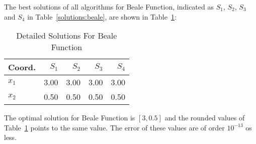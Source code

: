 
The best solutions of all algorithms for Beale Function, indicated as
$S_{1}$, $S_{2}$, $S_{3}$ and $S_{4}$ in Table~\ref{solutions:beale}, are shown
in Table~\ref{detailedsolutions:beale}:

\begin{table}[H]
\centering
\caption{Detailed Solutions For Beale Function}
\label{detailedsolutions:beale}
\begin{tabular}{lrrrr}
\toprule
 Coord. &  $S_{1}$ &  $S_{2}$ &  $S_{3}$ &  $S_{4}$ \\
\midrule
$x_{1}$ &     3.00 &     3.00 &     3.00 &     3.00 \\
$x_{2}$ &     0.50 &     0.50 &     0.50 &     0.50 \\
\bottomrule
\end{tabular}
\end{table}

The optimal solution for Beale Function is $\left[3, 0.5\right]$ and the rounded values
of Table~\ref{detailedsolutions:beale} points to the same value. The error of
these values are of order $10^{-13}$ os less.


